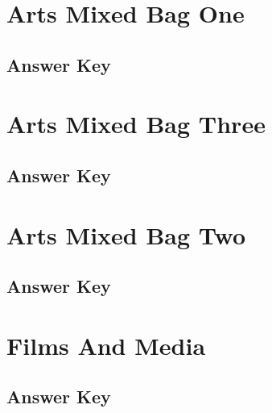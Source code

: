 \documentclass[12pt,a4paper]{book}
\newcounter{totalcounter}
\begin{document}
\setcounter{totalcounter}{1}

\section{Arts Mixed Bag One}



\subsection*{Answer Key}



\setcounter{totalcounter}{1}

\section{Arts Mixed Bag Three}



\subsection*{Answer Key}



\setcounter{totalcounter}{1}

\section{Arts Mixed Bag Two}



\subsection*{Answer Key}



\setcounter{totalcounter}{1}

\section{Films And Media}



\subsection*{Answer Key}
\end{document}
